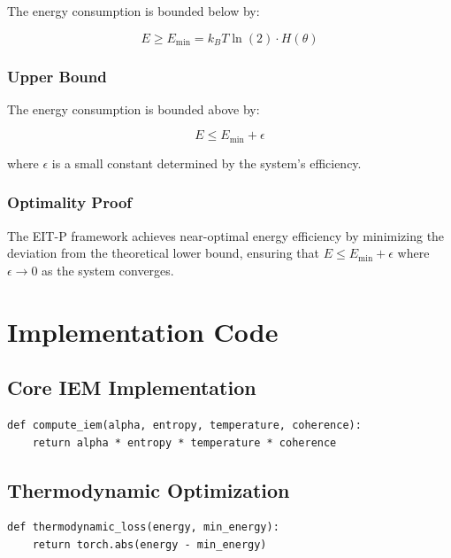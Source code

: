 \documentclass[12pt]{article}
\begin{document}
The energy consumption is bounded below by:

\begin{equation}
E \geq E_{\min} = k_B T \ln(2) \cdot H(\theta)
\end{equation}

\subsubsection{Upper Bound}

The energy consumption is bounded above by:

\begin{equation}
E \leq E_{\min} + \epsilon
\end{equation}

where $\epsilon$ is a small constant determined by the system's efficiency.

\subsubsection{Optimality Proof}

The EIT-P framework achieves near-optimal energy efficiency by minimizing the deviation from the theoretical lower bound, ensuring that $E \leq E_{\min} + \epsilon$ where $\epsilon \to 0$ as the system converges.

\section{Implementation Code}

\subsection{Core IEM Implementation}

\begin{verbatim}
def compute_iem(alpha, entropy, temperature, coherence):
    return alpha * entropy * temperature * coherence
\end{verbatim}

\subsection{Thermodynamic Optimization}

\begin{verbatim}
def thermodynamic_loss(energy, min_energy):
    return torch.abs(energy - min_energy)
\end{verbatim}
\end{document}

